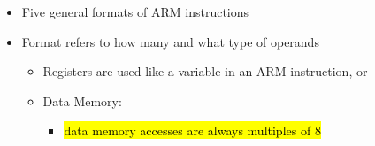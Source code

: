\begin{frame}[fragile]
\begin{itemize}
    \item Five general formats of ARM instructions
\item Format refers to how many and what type of operands
\begin{itemize}
    \item Registers are used like a variable in an ARM instruction, or
    \item Data Memory:
    \begin{itemize}
        \item \hl{data memory accesses are always multiples of 8}
    \end{itemize}
\end{itemize}



\end{itemize}
\end{frame}
